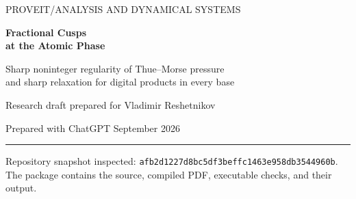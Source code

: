 \documentclass[11pt,a4paper]{article}
\numberwithin{equation}{section}
\theoremstyle{definition}
\theoremstyle{remark}
\begin{document}
\hypersetup{pageanchor=false}
\begin{titlepage}
\thispagestyle{empty}
\setlength{\parindent}{0pt}
{\small\sffamily\color{ink} PROVEIT\quad /\quad ANALYSIS AND DYNAMICAL SYSTEMS}\par
\vspace{18mm}
{\Huge\bfseries\color{ink} Fractional Cusps\\[3mm] at the Atomic Phase\par}
\vspace{8mm}
{\Large Sharp noninteger regularity of Thue--Morse pressure\\[2mm]
and sharp relaxation for digital products in every base\par}
\vspace{11mm}
{\large Research draft prepared for Vladimir Reshetnikov\par}
{Prepared with ChatGPT\quad\textbullet{} September 2026\par}
\vspace{10mm}
\hrule\vspace{4mm}
\begin{abstract}
For the doubling map and the singular potential
$\psi_c(x)=\log\cos^2\!\pi(x-c)$, we determine the phase regularity of
$P(q\psi_c)$ at the atomic phase for every $q>1/2$. For every noninteger
$q$ in this range the pressure is locally $C^{\lceil2q\rceil-1}$, but its
$\lceil2q\rceil$th derivative at the atomic phase does not exist. Its leading
nonanalytic term is explicit:
\[
 P(q\psi_c)=2q\log\cos\pi c+
 2(2^{2q}-1)\zeta(2q)|c|^{2q}+o(|c|^{2q}).
\]
Thus analyticity at integer orders is exceptional, not evidence for
analyticity at all positive orders.

The proof constructs a base-independent, periodized-sinc eigenfunction and
establishes a sharp operator-norm relaxation law on every H\"older space.
This supplies the spectral gap directly, without assuming a general
Perron theorem for a potential with zeros. A positive-eigenfunction
perturbation argument, a pressure--integral comparison, and one exact
identity at the fixed point then give the singular expansion. The same
argument works in every integer base $b\ge2$, with cusp coefficient
$2(b^{2q}-1)\zeta(2q)$. At positive integer $q=m$, the would-be cusp cancels
exactly the $2m$th coefficient of the analytic fixed-branch contribution,
recovering and extending the repository's missing-coefficient phenomenon.

The article includes full proofs, a sharpness argument for the convergence
rate, finite-size moment asymptotics, numerical diagnostics, explicit
provenance and limitations, and a research agenda. The results are claims
proved in this research draft; they are not independently refereed or
proof-assistant verified.
\end{abstract}
\vfill
{\small\color{muted} Repository snapshot inspected:
\nolinkurl{afb2d1227d8bc5df3beffc1463e958db3544960b}.\\
The package contains the source, compiled PDF, executable checks, and their output.}
\end{titlepage}
\end{document}
